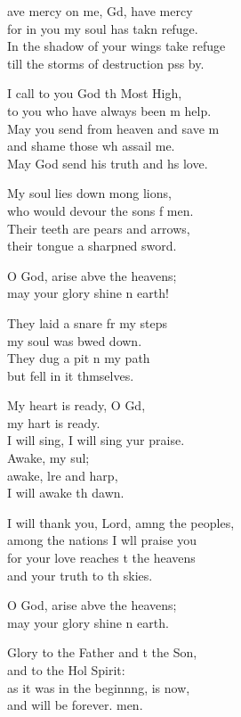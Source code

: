 \settowidth{\versewidth}{I will thank you, Lord, among the peoples, *}
\begin{psalmverse}%
  \begin{patverse}
    ave mercy on me, Gd, have mercy\Med\\
for in you my soul has takn refuge.\\
In the shadow of your wings  take refuge\Med\\
till the storms of destruction pss by.

I call to you God th Most High,\Med\\
to you who have always been m help.\\
May you send from heaven and save m\Flex\\
and shame those wh assail me.\Med\\
May God send his truth and h\pointup{\i}s love.

My soul lies down mong lions,\Med\\
who would devour the sons f men.\\
Their teeth are pears and arrows,\Med\\
their tongue a sharpned sword.

O God, arise abve the heavens;\Med\\
may your glory shine n earth!

They laid a snare fr my steps\Med\\
my soul was bwed down.\\
They dug a pit \pointup{\i}n my path\Med\\
but fell in it thmselves.

My heart is ready, O Gd,\Flex\\
my hart is ready.\Med\\
I will sing, I will sing yur praise.\\
Awake, my sul;\Flex\\
awake, lre and harp,\Med\\
I will awake th dawn.

I will thank you, Lord, amng the peoples,\Med\\
among the nations I w\pointup{\i}ll praise you\\
for your love reaches t the heavens\Med\\
and your truth to th skies.

O God, arise abve the heavens;\Med\\
may your glory shine n earth.

Glory to the Father and t the Son,\Med\\
and to the Hol Spirit:\\
as it was in the beginn\pointup{\i}ng, is now,\Med\\
and will be forever. men. 
  \end{patverse}
\end{psalmverse}
